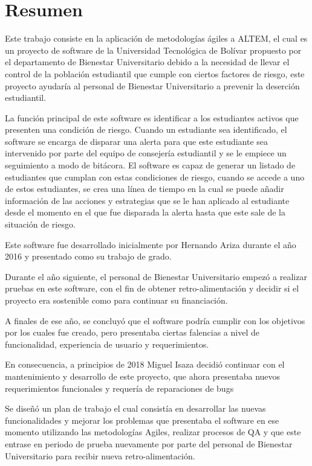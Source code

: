 \chapter*{Resumen} 

Este trabajo consiste en la aplicación de metodologías ágiles a ALTEM, el cual es un proyecto de software de la Universidad Tecnológica de Bolívar propuesto por el departamento de Bienestar Universitario debido a la necesidad de llevar el control de la población estudiantil que cumple con ciertos factores de riesgo, este proyecto ayudaría al personal de Bienestar Universitario a prevenir la deserción estudiantil.

La función principal de este software es identificar a los estudiantes activos que presenten una condición de riesgo. Cuando un estudiante sea identificado, el software se encarga de disparar una alerta para que este estudiante sea intervenido por parte del equipo de consejería estudiantil y se le empiece un seguimiento a modo de bitácora. 
El software es capaz de generar un listado de estudiantes que cumplan con estas condiciones de riesgo, cuando se accede a uno de estos estudiantes, se crea una línea de tiempo en la cual se puede añadir información de las acciones y estrategias que se le han aplicado al estudiante desde el momento en el que fue disparada la alerta hasta que este sale de la situación de riesgo. 

Este software fue desarrollado inicialmente por Hernando Ariza durante el año 2016 y presentado como su trabajo de grado. 

Durante el año siguiente, el personal de Bienestar Universitario empezó a realizar pruebas en este software, con el fin de obtener retro-alimentación y decidir si el proyecto era sostenible como para continuar su financiación. 

A finales de ese año, se concluyó que el software podría cumplir con los objetivos por los cuales fue creado, pero presentaba ciertas falencias a nivel de funcionalidad, experiencia de usuario y requerimientos.

En consecuencia, a principios de 2018 Miguel Isaza decidió continuar con el mantenimiento y desarrollo de este proyecto, que ahora presentaba nuevos requerimientos funcionales y requería de reparaciones de bugs

Se diseñó un plan de trabajo el cual consistía en desarrollar las nuevas funcionalidades y mejorar los problemas que presentaba el software en ese momento utilizando las metodologías Agiles, realizar procesos de QA y que este entrase en periodo de prueba nuevamente por parte del personal de Bienestar Universitario para recibir nueva retro-alimentación. 
